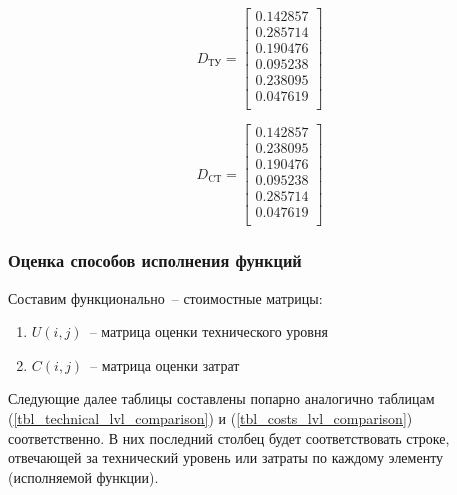 \begin{equation}
    D_\text{ТУ} =
    \begin{bmatrix}
        0.142857 \\
        0.285714 \\
        0.190476 \\
        0.095238 \\
        0.238095 \\
        0.047619 \\
    \end{bmatrix}
    \label{eq_tu_matrix}
\end{equation}

\begin{equation}
    D_\text{CТ} =
    \begin{bmatrix}
        0.142857 \\
        0.238095 \\
        0.190476 \\
        0.095238 \\
        0.285714 \\
        0.047619 \\
    \end{bmatrix}
    \label{eq_st_matrix}
\end{equation}

\subsubsection{Оценка способов исполнения функций}
Составим функционально~-- стоимостные матрицы:
\begin{enumerate}
    \item $U(i,j)$~-- матрица оценки технического уровня
    \item $C(i,j)$~-- матрица оценки затрат
\end{enumerate}

Следующие далее таблицы составлены попарно аналогично таблицам
(\ref{tbl_technical_lvl_comparison}) и (\ref{tbl_costs_lvl_comparison})
соответственно. В них последний столбец будет соответствовать строке, отвечающей
за технический уровень или затраты по каждому элементу (исполняемой функции).

